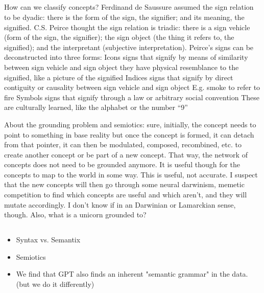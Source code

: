\subsection{}
How can we classify concepts?
Ferdinand de Saussure assumed the sign relation to be dyadic: 
there is the form of the sign, the signifier; 
and its meaning, the signified. 
C.S. Peirce thought the sign relation is triadic: 
there is a sign vehicle (form of the sign, the signifier); 
the sign object (the thing it refers to, the signified);
and the interpretant (subjective interpretation). 
Peirce's signs can be deconstructed into three forms:
Icons
	signs that signify by means of similarity between sign vehicle and sign object
	they have physical resemblance to the signified, like a picture of the signified
Indices
	signs that signify by direct contiguity or causality between sign vehicle and sign object
	E.g. smoke to refer to fire
Symbols 
	signs that signify through a law or arbitrary social convention
	These are culturally learned, like the alphabet or the number “9”


About the grounding problem and semiotics: sure, initially, the concept needs to point to something in base reality but once the concept is formed, it can detach from that pointer, it can then be modulated, composed, recombined, etc. to create another concept or be part of a new concept. That way, the network of concepts does not need to be grounded anymore. It is useful though for the concepts to map to the world in some way. This is useful, not accurate. I suspect that the new concepts will then go through some neural darwinism, memetic competition to find which concepts are useful and which aren't, and they will mutate accordingly. I don’t know if in an Darwinian or Lamarckian sense, though. Also, what is a unicorn grounded to?


\subsection{}
\begin{itemize}
    \item Syntax vs. Semantix
    \item Semiotics
    \item We find that GPT also finds an inherent "semantic grammar" in the data. (but we do it differently)
\end{itemize}

